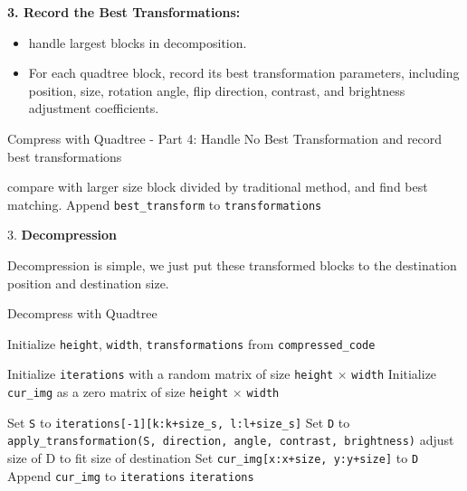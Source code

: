 \documentclass[a4paper,11pt, titlepage]{article}
\theoremstyle{definition}
\theoremstyle{plain}
\theoremstyle{remark}
\theoremstyle{definition}
\begin{document}
\textbf{3. Record the Best Transformations:}
\begin{itemize}
    \item handle largest blocks in decomposition.
    \item For each quadtree block, record its best transformation parameters, including position, size, rotation angle, flip direction, contrast, and brightness adjustment coefficients.
\end{itemize}


\begin{algorithm}
\caption{Compress with Quadtree - Part 4: Handle No Best Transformation and record best transformations}
\begin{algorithmic}[1]
        \STATE compare with larger size block divided by traditional method, and find best matching. 
    \ENDIF
    \STATE Append \texttt{best\_transform} to \texttt{transformations}
\end{algorithmic}
\end{algorithm}

3. \textbf{Decompression}

Decompression is simple, we just put these transformed blocks
to the destination position and destination size. 

\begin{algorithm}
\caption{Decompress with Quadtree}
\begin{algorithmic}[1]
\STATE Initialize \texttt{height}, \texttt{width}, \texttt{transformations} from \texttt{compressed\_code}

\STATE Initialize \texttt{iterations} with a random matrix of size \texttt{height} $\times$ \texttt{width}
\STATE Initialize \texttt{cur\_img} as a zero matrix of size \texttt{height} $\times$ \texttt{width}

        \STATE Set \texttt{S} to \texttt{iterations[-1][k:k+size\_s, l:l+size\_s]}
        \STATE Set \texttt{D} to \texttt{apply\_transformation(S, direction, angle, contrast, brightness)}
            \STATE adjust size of D to fit size of destination
        \ENDIF
        \STATE Set \texttt{cur\_img[x:x+size, y:y+size]} to \texttt{D}
    \ENDFOR
    \STATE Append \texttt{cur\_img} to \texttt{iterations}
\ENDFOR
\RETURN \texttt{iterations}
\end{algorithmic}
\end{algorithm}
\end{document}
